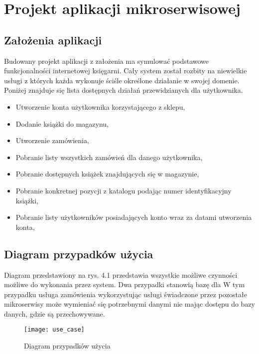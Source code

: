 \chapter{Projekt aplikacji mikroserwisowej}
\section{Założenia aplikacji}
\par Budowany projekt aplikacji z założenia ma symulować podstawowe funkcjonalności internetowej księgarni. Cały system został rozbity na niewielkie usługi z których każda wykonuje ściśle określone działanie w swojej domenie. Poniżej znajduje się lista dostępnych działań przewidzianych dla użytkownika. 
\begin{itemize}
    \item Utworzenie konta użytkownika korzystającego z sklepu,
    \item Dodanie książki do magazynu,
    \item Utworzenie zamówienia,
    \item Pobranie listy wszystkich zamówień dla danego użytkownika,
    \item Pobranie dostępnych książek znajdujących się w magazynie,
    \item Pobranie konkretnej pozycji z katalogu podając numer identyfikacyjny książki,
    \item Pobranie listy użytkowników posiadających konto wraz za datami utworzenia konta,
\end{itemize}
\section{Diagram przypadków użycia}
\par Diagram przedstawiony na rys. 4.1 przedstawia wszystkie możliwe czynności możliwe do wykonania przez system. Dwa przypadki stanowią bazę dla  W tym przypadku usługa zamówienia wykorzystując usługi świadczone przez pozostałe mikroserwisy może wymieniać się potrzebnymi danymi nie mając dostępu do bazy danych, gdzie są przechowywane.
\begin{figure}[h]
    \caption{Diagram przypadków użycia}
    \texttt{[image: use\_case]}
    \centering
\end{figure}
\newpage
